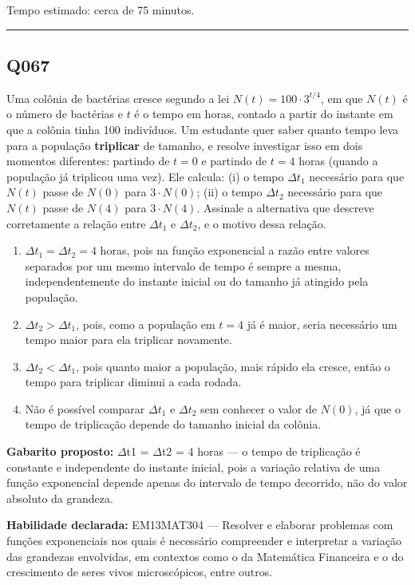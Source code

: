 \documentclass[11pt,a4paper]{article}
\begin{document}
Tempo estimado: cerca de 75 minutos.
\bigskip\hrule\bigskip
\begin{samepage}
\subsection*{Q067}
Uma colônia de bactérias cresce segundo a lei $N(t) = 100 \cdot 3^{t/4}$, em que $N(t)$ é o número de bactérias e $t$ é o tempo em horas, contado a partir do instante em que a colônia tinha 100 indivíduos. Um estudante quer saber quanto tempo leva para a população \textbf{triplicar} de tamanho, e resolve investigar isso em dois momentos diferentes: partindo de $t=0$ e partindo de $t=4$ horas (quando a população já triplicou uma vez). Ele calcula: (i) o tempo $\Delta t_1$ necessário para que $N(t)$ passe de $N(0)$ para $3\cdot N(0)$; (ii) o tempo $\Delta t_2$ necessário para que $N(t)$ passe de $N(4)$ para $3\cdot N(4)$. Assinale a alternativa que descreve corretamente a relação entre $\Delta t_1$ e $\Delta t_2$, e o motivo dessa relação.
\begin{enumerate}[label=(\alph*),nosep,leftmargin=*]
\item $\Delta t_1 = \Delta t_2 = 4$ horas, pois na função exponencial a razão entre valores separados por um mesmo intervalo de tempo é sempre a mesma, independentemente do instante inicial ou do tamanho já atingido pela população.
\item $\Delta t_2 > \Delta t_1$, pois, como a população em $t=4$ já é maior, seria necessário um tempo maior para ela triplicar novamente.
\item $\Delta t_2 < \Delta t_1$, pois quanto maior a população, mais rápido ela cresce, então o tempo para triplicar diminui a cada rodada.
\item Não é possível comparar $\Delta t_1$ e $\Delta t_2$ sem conhecer o valor de $N(0)$, já que o tempo de triplicação depende do tamanho inicial da colônia.
\end{enumerate}

\textbf{Gabarito proposto:} $\Delta$t1 = $\Delta$t2 = 4 horas — o tempo de triplicação é constante e independente do instante inicial, pois a variação relativa de uma função exponencial depende apenas do intervalo de tempo decorrido, não do valor absoluto da grandeza.

\textbf{Habilidade declarada:} EM13MAT304 --- Resolver e elaborar problemas com funções exponenciais nos quais é necessário compreender e interpretar a variação das grandezas envolvidas, em contextos como o da Matemática Financeira e o do crescimento de seres vivos microscópicos, entre outros.
\end{samepage}
\end{document}
